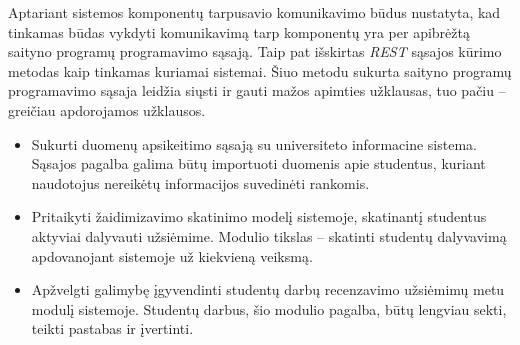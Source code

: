 \documentclass{VUMIFPSbakalaurinis}
\begin{document}
Aptariant sistemos komponentų tarpusavio komunikavimo būdus nustatyta, kad tinkamas būdas vykdyti komunikavimą tarp komponentų yra per apibrėžtą saityno programų programavimo sąsają. Taip pat išskirtas \textit{REST} sąsajos kūrimo metodas kaip tinkamas kuriamai sistemai. Šiuo metodu sukurta saityno programų programavimo sąsaja leidžia siųsti ir gauti mažos apimties užklausas, tuo pačiu – greičiau apdorojamos užklausos.


\begin{itemize}
	\item Sukurti duomenų apsikeitimo sąsają su universiteto informacine sistema. Sąsajos pagalba galima būtų importuoti duomenis apie studentus, kuriant naudotojus nereikėtų informacijos suvedinėti rankomis.
	\item Pritaikyti žaidimizavimo skatinimo modelį sistemoje, skatinantį studentus aktyviai dalyvauti užsiėmime. Modulio tikslas – skatinti studentų dalyvavimą apdovanojant sistemoje už kiekvieną veiksmą.
	\item Apžvelgti galimybę įgyvendinti studentų darbų recenzavimo užsiėmimų metu modulį sistemoje. Studentų darbus, šio modulio pagalba, būtų lengviau sekti, teikti pastabas ir įvertinti. 
\end{itemize}

\printbibliography[heading=bibintoc]  %


\end{document}
